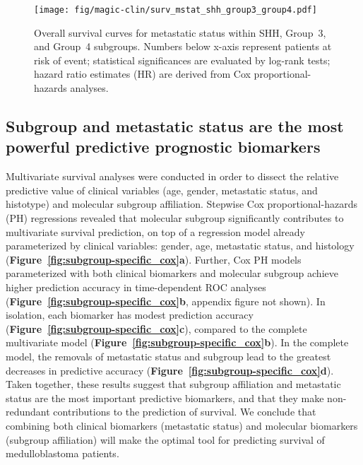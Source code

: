 \documentclass[11pt,letterpaper]{article}
\theoremstyle{definition}
\newcommand{\emphlab}[1]{\textbf{\textsf{#1}}}
\newcommand{\citefig}[1]{\emphlab{Figure~\ref{fig:#1}}}
\begin{document}
\begin{figure}[ht]
	\begin{center}
		\texttt{[image: fig/magic-clin/surv\_mstat\_shh\_group3\_group4.pdf]}
	\end{center}
	\caption[Overall survival curves for metastatic status within SHH, Group~3, and Group~4 subgroups]
	{
	Overall survival curves for metastatic status within SHH, Group~3, and Group~4 subgroups.
	Numbers below x-axis represent patients at risk of event; statistical significances are evaluated by log-rank tests; hazard ratio estimates (HR) are derived from Cox proportional-hazards analyses.
	}
	\label{fig:surv_mstat_shh_group3_group4}
\end{figure}

\clearpage

\subsection{Subgroup and metastatic status are the most powerful predictive prognostic biomarkers}

Multivariate survival analyses were conducted in order to dissect the relative predictive value of clinical variables (age, gender, metastatic status, and histotype) and molecular subgroup affiliation. Stepwise Cox proportional-hazards (PH) regressions revealed that molecular subgroup significantly contributes to multivariate survival prediction, on top of a regression model already parameterized by clinical variables: gender, age, metastatic status, and histology (\citefig{subgroup-specific_cox}\emphlab{a}). Further, Cox PH models parameterized with both clinical biomarkers and molecular subgroup achieve higher prediction accuracy in time-dependent ROC analyses (\citefig{subgroup-specific_cox}\emphlab{b}, appendix figure not shown). In isolation, each biomarker has modest prediction accuracy (\citefig{subgroup-specific_cox}\emphlab{c}), compared to the complete multivariate model (\citefig{subgroup-specific_cox}\emphlab{b}). In the complete model, the removals of metastatic status and subgroup lead to the greatest decreases in predictive accuracy (\citefig{subgroup-specific_cox}\emphlab{d}). Taken together, these results suggest that subgroup affiliation and metastatic status are the most important predictive biomarkers, and that they make non-redundant contributions to the prediction of survival. We conclude that combining both clinical biomarkers (metastatic status) and molecular biomarkers (subgroup affiliation) will make the optimal tool for predicting survival of medulloblastoma patients.
\end{document}
